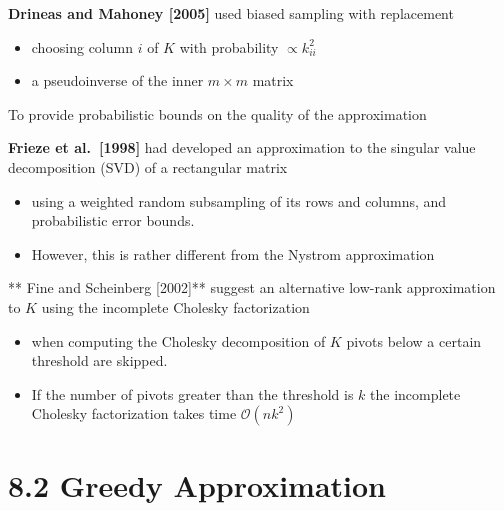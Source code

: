 \documentclass[
  ignorenonframetext,
]{beamer}
\providecommand{\tightlist}{%
  \setlength{\itemsep}{0pt}\setlength{\parskip}{0pt}}
\begin{document}
\begin{frame}{}
\protect\hypertarget{section-5}{}
\textbf{Drineas and Mahoney {[}2005{]}} used biased sampling with
replacement

\begin{itemize}
\tightlist
\item
  choosing column \(i\) of \(K\) with probability \(\propto k_{ii}^2\)
\item
  a pseudoinverse of the inner \(m \times m\) matrix
\end{itemize}

To provide probabilistic bounds on the quality of the approximation
\end{frame}

\begin{frame}{}
\protect\hypertarget{section-6}{}
\textbf{Frieze et al.~{[}1998{]}} had developed an approximation to the
singular value decomposition (SVD) of a rectangular matrix

\begin{itemize}
\item
  using a weighted random subsampling of its rows and columns, and
  probabilistic error bounds.
\item
  However, this is rather different from the Nystrom approximation
\end{itemize}

** Fine and Scheinberg {[}2002{]}** suggest an alternative low-rank
approximation to \(K\) using the incomplete Cholesky factorization

\begin{itemize}
\tightlist
\item
  when computing the Cholesky decomposition of \(K\) pivots below a
  certain threshold are skipped.
\item
  If the number of pivots greater than the threshold is \(k\) the
  incomplete Cholesky factorization takes time \(\mathcal O(nk^2)\)
\end{itemize}
\end{frame}

\hypertarget{greedy-approximation}{%
\section{8.2 Greedy Approximation}\label{greedy-approximation}}
\end{document}
